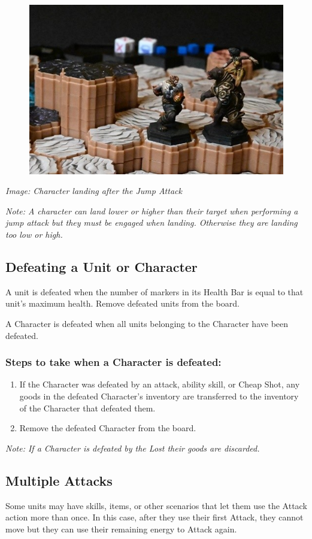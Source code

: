 \documentclass[../main.tex]{subfiles}
\begin{document}
\begin{figure}[h]
    \centering
    \includegraphics[width=1\linewidth]{chapters//TargetingandCombat/TimeStrikeJumpAttack2.jpg}
\end{figure}
\textit{Image: Character landing after the Jump Attack}

\textit{Note: A character can land lower or higher than their target when performing a jump attack but they must be engaged when landing. Otherwise they are landing too low or high.}

\subsection{Defeating a Unit or Character}
A unit is defeated when the number of markers in its Health Bar is equal to that unit’s maximum health. Remove defeated units from the board.

A Character is defeated when all units belonging to the Character have been defeated.

\subsubsection{Steps to take when a Character is defeated:}
\begin{enumerate}
    \item If the Character was defeated by an attack, ability skill, or Cheap Shot, any goods in the defeated Character’s inventory are transferred to the inventory of the Character that defeated them.
    \item Remove the defeated Character from the board.
\end{enumerate}
\textit{Note: If a Character is defeated by the Lost their goods are discarded.}

\subsection{Multiple Attacks}

Some units may have skills, items, or other scenarios that let them use the Attack action more than once. In this case, after they use their first Attack, they cannot move but they can use their remaining energy to Attack again.

\clearpage
\end{document}
